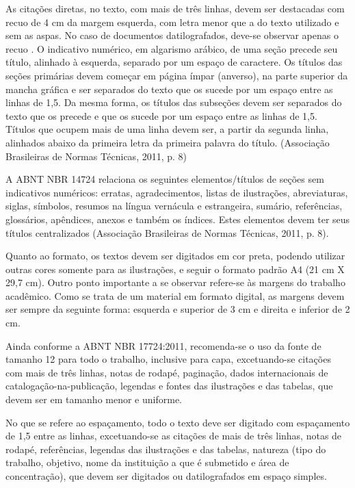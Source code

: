 \documentclass[
	12pt,				%
	openright,			%
	oneside,			%
	a4paper,			%
	english,			%
	french,				%
	spanish,			%
	brazil				%
	]{abntex2UFMT}
\begin{document}
\begin{citacao}
As citações diretas, no texto, com mais de três linhas, devem ser
destacadas com recuo de 4 cm da margem esquerda, com letra menor que
a do texto utilizado e sem as aspas. No caso de documentos datilografados,
deve-se observar apenas o recuo \cite{NBR10520:2002}. O indicativo numérico, em algarismo arábico, de uma seção precede seu título, alinhado à esquerda, separado por um espaço de caractere. Os títulos das seções primárias devem começar em página ímpar (anverso), na parte superior da mancha gráfica e ser separados do texto que os sucede por um espaço entre as linhas de 1,5. Da mesma forma, os títulos das subseções devem ser separados do texto que os precede e que os sucede por um espaço entre as linhas de 1,5. Títulos que ocupem mais de uma linha devem ser, a partir da segunda linha, alinhados abaixo da primeira letra da primeira palavra do título. (Associação Brasileiras de Normas Técnicas, 2011, p. 8)
\end{citacao}

A ABNT NBR 14724 relaciona os seguintes elementos/títulos de seções sem indicativos numéricos: erratas, agradecimentos, listas de ilustrações, abreviaturas, siglas, símbolos, resumos na língua vernácula e estrangeira, sumário, referências, glossários, apêndices, anexos e também os índices. Estes elementos devem ter seus títulos centralizados (Associação Brasileiras de Normas Técnicas, 2011, p. 8).

Quanto ao formato, os textos devem ser digitados em cor preta, podendo utilizar outras cores somente para as ilustrações, e seguir o formato padrão A4 (21 cm X 29,7 cm).
Outro ponto importante a se observar refere-se às margens do trabalho acadêmico. Como se trata de um material em formato digital, as margens devem ser sempre da seguinte forma: esquerda e superior de 3 cm e direita e inferior de 2 cm.

Ainda conforme a ABNT NBR 17724:2011, recomenda-se o uso da fonte de tamanho 12 para todo o trabalho, inclusive para capa, excetuando-se citações com mais de três linhas, notas de rodapé, paginação, dados internacionais de catalogação-na-publicação, legendas e fontes das ilustrações e das tabelas, que devem ser em tamanho menor e uniforme.

No que se refere ao espaçamento, todo o texto deve ser digitado com espaçamento de 1,5 entre as linhas, excetuando-se as citações de mais de três linhas, notas de rodapé, referências, legendas das ilustrações e das tabelas, natureza (tipo do trabalho, objetivo, nome da instituição a que é submetido e área de concentração), que devem ser digitados ou datilografados em espaço simples.
\end{document}
